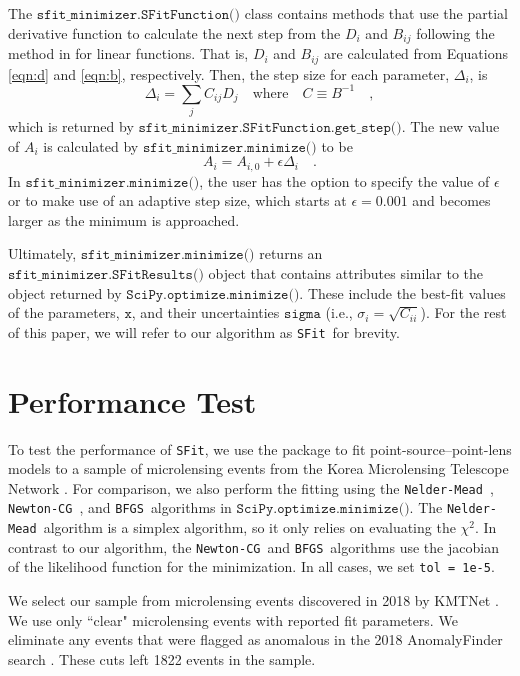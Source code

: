\documentclass[preprint]{aastex631}
\newcommand{\minimize}{$\texttt{SciPy.optimize.minimize()}$}
\newcommand{\neldarmead}{\texttt{Nelder-Mead}}
\newcommand{\newtoncg}{\texttt{Newton-CG}}
\newcommand{\bfgs}{\texttt{BFGS}}
\newcommand{\sfit}{\texttt{SFit}}
\begin{document}
The $\texttt{sfit\_minimizer.SFitFunction()}$ class contains methods that use the partial derivative function to calculate the next step from the $D_i$ and $B_{ij}$ following the method in \citet{Gould03} for linear functions. That is, $D_i$ and $B_{ij}$ are calculated from Equations \ref{eqn:d} and \ref{eqn:b}, respectively. Then, the step size for each parameter, $\Delta_i$, is
\begin{equation}
\Delta_i = \sum_j C_{ij} D_j \quad \mathrm{where} \quad C \equiv B^{-1} \quad,
\end{equation}
which is returned by $\texttt{sfit\_minimizer.SFitFunction.get\_step()}$.
The new value of $A_i$ is calculated by $\texttt{sfit\_minimizer.minimize()}$ to be
\begin{equation}
A_i = A_{i, 0} + \epsilon \Delta_i \quad . 
\end{equation}
In  $\texttt{sfit\_minimizer.minimize()}$, the user has the option to specify the value of $\epsilon$ or to make use of an adaptive step size, which starts at $\epsilon = 0.001$ and becomes larger as the minimum is approached.

Ultimately, $\texttt{sfit\_minimizer.minimize()}$ returns an $\texttt{sfit\_minimizer.SFitResults()}$ object that contains attributes similar to the object returned by \minimize. These include the best-fit values of the parameters, $\texttt{x}$, and their uncertainties $\texttt{sigma}$ (i.e., $\sigma_i = \sqrt{C_{ii}}$). For the rest of this paper, we will refer to our algorithm as \sfit\, for brevity.


\section{Performance Test}

To test the performance of \sfit, we use the package to fit point-source--point-lens models \citep{Paczynski86b} to a sample of microlensing events from the Korea Microlensing Telescope Network \citep[KMTNet;][]{Kim16_KMTNet}. For comparison, we also perform the fitting using the \neldarmead\, \citep{NelderMead}, \newtoncg\, \citep{QuasiNewtonMethods}, and \bfgs\, \citep{QuasiNewtonMethods} algorithms in \minimize. The \neldarmead\, algorithm is a simplex algorithm, so it only relies on evaluating the $\chi^2$. In contrast to our algorithm, the \newtoncg\, and \bfgs\, algorithms use the jacobian of the likelihood function for the minimization. In all cases, we set \texttt{tol = 1e-5}.

We select  our sample from microlensing events discovered in 2018 by KMTNet \citep{KimKim18_EF, Kim18EF,Kim18_AF}. We use only ``clear" microlensing events with reported fit parameters. We eliminate any events that were flagged as anomalous in the 2018 AnomalyFinder search \citep[although possible finite source or buried host events were left in the sample;][]{Gould22AF5,Jung22AF6}. These cuts left 1822 events in the sample. 
\end{document}
